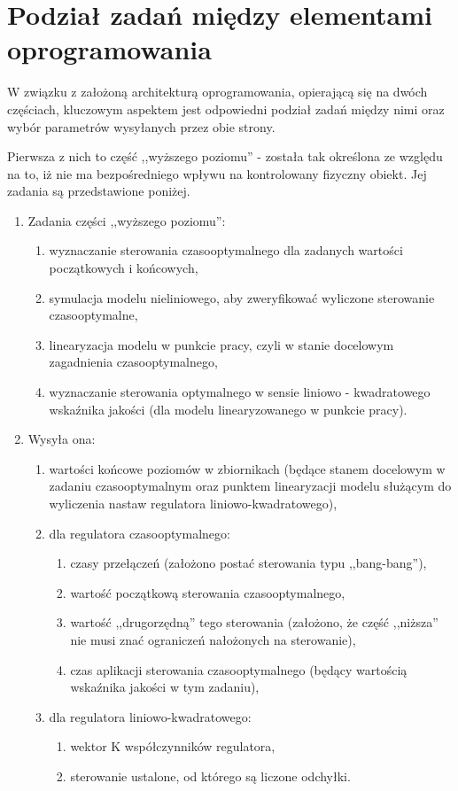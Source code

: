 \section{Podział zadań między elementami oprogramowania}
\label{sec:podzial-zadan}

W związku z założoną architekturą oprogramowania, opierającą się na dwóch częściach, kluczowym aspektem jest odpowiedni podział zadań między nimi oraz wybór parametrów wysyłanych przez obie strony.

Pierwsza z nich to część ,,wyższego poziomu'' - została tak określona ze względu na to, iż nie ma bezpośredniego wpływu na kontrolowany fizyczny obiekt. Jej zadania są przedstawione poniżej.

\begin{enumerate}
    \item Zadania części ,,wyższego poziomu'':
    \begin{enumerate}
        \item wyznaczanie sterowania czasooptymalnego dla zadanych wartości początkowych i końcowych,
        \item symulacja modelu nieliniowego, aby zweryfikować wyliczone sterowanie czasooptymalne,
        \item linearyzacja modelu w punkcie pracy, czyli w stanie docelowym zagadnienia czasooptymalnego,
        \item wyznaczanie sterowania optymalnego w sensie liniowo - kwadratowego wskaźnika jakości (dla modelu linearyzowanego w punkcie pracy).
    \end{enumerate}
    \item Wysyła ona:
    \begin{enumerate}
        \item wartości końcowe poziomów w zbiornikach (będące stanem docelowym w zadaniu czasooptymalnym oraz punktem linearyzacji modelu służącym do wyliczenia nastaw regulatora liniowo-kwadratowego),
        \item dla regulatora czasooptymalnego:
        \begin{enumerate}
            \item czasy przełączeń (założono postać sterowania typu ,,bang-bang''),
            \item wartość początkową sterowania czasooptymalnego,
            \item wartość ,,drugorzędną'' tego sterowania (założono, że część ,,niższa'' nie musi znać ograniczeń nałożonych na sterowanie),
            \item czas aplikacji sterowania czasooptymalnego (będący wartością wskaźnika jakości w tym zadaniu),
        \end{enumerate}
        \item dla regulatora liniowo-kwadratowego:
        \begin{enumerate}
            \item wektor K współczynników regulatora,
            \item sterowanie ustalone, od którego są liczone odchyłki.
        \end{enumerate}
    \end{enumerate}
\end{enumerate}